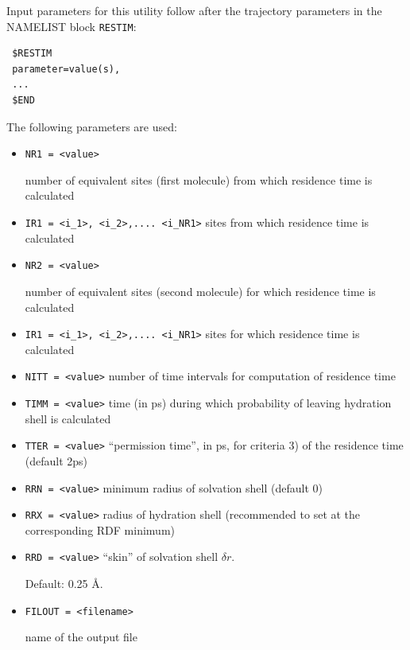 \documentclass{article}
\begin{document}
Input parameters for this utility follow after the trajectory parameters
in the NAMELIST block \verb|RESTIM|:

\begin{verbatim}
 $RESTIM
 parameter=value(s),
 ...
 $END
\end{verbatim}

The following parameters are used:

\begin{itemize}

\item
\verb|NR1 = <value>|  

number of equivalent sites (first molecule) from which residence time is calculated

\item
\verb|IR1 = <i_1>, <i_2>,.... <i_NR1>|  
sites from which residence time is calculated

\item
\verb|NR2 = <value>|  

number of equivalent sites (second molecule) for which residence time is 
calculated

\item
\verb|IR1 = <i_1>, <i_2>,.... <i_NR1>|  
sites for which residence time is calculated

\item
\verb|NITT = <value>|
number of time intervals for computation of residence time

\item
\verb|TIMM = <value>|
time (in ps) during which probability of leaving hydration shell is calculated

\item
\verb|TTER = <value>|
``permission time'', in ps, for criteria 3) of the residence time (default 2ps)

\item
\verb|RRN = <value>| 
minimum radius of solvation shell (default 0)

\item
\verb|RRX = <value>|
radius of hydration shell (recommended to set at the corresponding RDF minimum)

\item
\verb|RRD = <value>|
``skin'' of solvation shell $\delta r$.

Default:  0.25 \AA.

\item
\verb|FILOUT = <filename>| 

name of the output file
\end{itemize}
\end{document}
